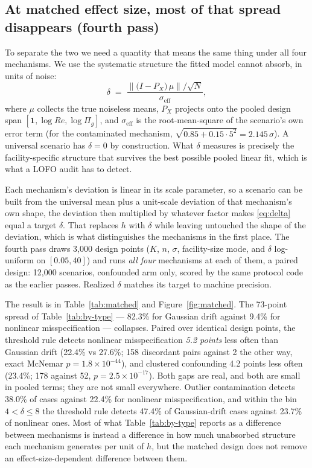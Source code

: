 \documentclass[journal=dce]{CUP-JNL-DTM}%
\begin{document}
\subsection{At matched effect size, most of that spread disappears (fourth pass)}
\label{sec:results-v4}

To separate the two we need a quantity that means the same thing under all four mechanisms. We use the systematic structure the fitted model cannot absorb, in units of noise:
\begin{equation}
\delta \;=\;
\frac{\bigl\lVert \bigl(I-P_X\bigr)\,\mu \bigr\rVert / \sqrt{N}}{\sigma_{\mathrm{eff}}},
\label{eq:delta}
\end{equation}
where $\mu$ collects the true noiseless means, $P_X$ projects onto the pooled design span $[\mathbf{1},\log Re,\log \Pi_g]$, and $\sigma_{\mathrm{eff}}$ is the root-mean-square of the scenario's own error term (for the contaminated mechanism, $\sqrt{0.85+0.15\cdot 5^2}=2.145\,\sigma$). A universal scenario has $\delta=0$ by construction. What $\delta$ measures is precisely the facility-specific structure that survives the best possible pooled linear fit, which is what a LOFO audit has to detect.

Each mechanism's deviation is linear in its scale parameter, so a scenario can be built from the universal mean plus a unit-scale deviation of that mechanism's own shape, the deviation then multiplied by whatever factor makes \eqref{eq:delta} equal a target $\delta$. That replaces $h$ with $\delta$ while leaving untouched the shape of the deviation, which is what distinguishes the mechanisms in the first place. The fourth pass draws 3,000 design points ($K$, $n$, $\sigma$, facility-size mode, and $\delta$ log-uniform on $[0.05,40]$) and runs \emph{all four} mechanisms at each of them, a paired design: 12,000 scenarios, confounded arm only, scored by the same protocol code as the earlier passes. Realized $\delta$ matches its target to machine precision.

The result is in Table~\ref{tab:matched} and Figure~\ref{fig:matched}. The 73-point spread of Table~\ref{tab:by-type} --- 82.3\% for Gaussian drift against 9.4\% for nonlinear misspecification --- collapses. Paired over identical design points, the threshold rule detects nonlinear misspecification \emph{5.2 points} less often than Gaussian drift (22.4\% vs 27.6\%; 158 discordant pairs against 2 the other way, exact McNemar $p=1.8\times10^{-44}$), and clustered confounding 4.2 points less often (23.4\%; 178 against 52, $p=2.5\times10^{-17}$). Both gaps are real, and both are small in pooled terms; they are not small everywhere. Outlier contamination detects 38.0\% of cases against 22.4\% for nonlinear misspecification, and within the bin $4<\delta\le8$ the threshold rule detects 47.4\% of Gaussian-drift cases against 23.7\% of nonlinear ones. Most of what Table~\ref{tab:by-type} reports as a difference between mechanisms is instead a difference in how much unabsorbed structure each mechanism generates per unit of $h$, but the matched design does not remove an effect-size-dependent difference between them.
\end{document}
